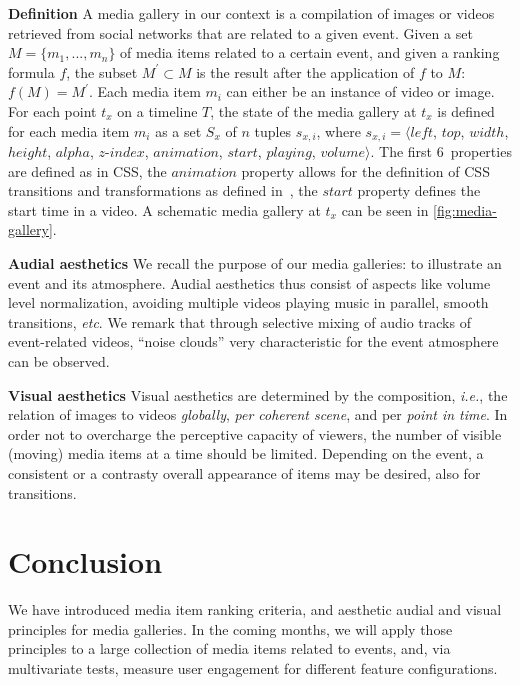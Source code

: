 \documentclass{article}
\let\oldsection\section
\renewcommand{\section}[1]{\oldsection{#1}\vspace{-1em}}
\begin{document}
\noindent \textbf{Definition}
A media gallery in our context is a compilation of images or videos
retrieved from social networks that are related to a given event.
Given a set $M = \{m_1,..., m_n\}$ of media items related to a certain event,
and given a ranking formula $f$,
the subset $M^\prime \subset M$
is the result after the application of $f$ to $M$: $f(M)=M^\prime$.
Each media item $m_i$ can either be an instance of video or image.
For each point $t_x$ on a timeline $T$, the state of the media gallery
at $t_x$ is defined for each media item $m_i$
as a set $S_x$ of $n$ tuples $s_{x,i}$, where
$s_{x,i}=\langle \mathit{left}$, $\mathit{top}$, $\mathit{width}$, $\mathit{height}$,
$\mathit{alpha}$, $\mathit{z\mbox{-}index}$, $\mathit{animation}$,
$\mathit{start}$, $\mathit{playing}$, $\mathit{volume} \rangle$.
The first 6~properties are defined as in CSS, the $\mathit{animation}$ property
allows for the definition of CSS transitions
and transformations as defined in~\cite{CSSTransitions2009,CSSTransforms2012},
the $\mathit{start}$ property defines the start time in a video.
A schematic media gallery at $t_x$ can be seen in \autoref{fig:media-gallery}.

\noindent \textbf{Audial aesthetics}
We recall the purpose of our media galleries:
to illustrate an event and its atmosphere.
Audial aesthetics thus consist of aspects like volume level normalization,
avoiding multiple videos playing music in parallel, smooth transitions, \emph{etc}.
We remark that through selective mixing of audio tracks
of event-related videos, ``noise clouds'' very characteristic
for the event atmosphere can be observed.

\noindent \textbf{Visual aesthetics}
Visual aesthetics are determined by the composition, \emph{i.e.},
the relation of images to videos \emph{globally}, \emph{per coherent scene},
and per \emph{point in time}.
In order not to overcharge the perceptive capacity
of viewers, the number of visible (moving) media items
at a time should be limited.
Depending on the event, a consistent or a contrasty overall
appearance of items may be desired, also for transitions.

\section{Conclusion}
We have introduced media item ranking criteria, and
aesthetic audial and visual principles for media galleries.
In the coming months, we will apply those principles
to a large collection of media items related to events,
and, via multivariate tests, measure user engagement
for different feature configurations.

\let\oldbibitem\bibitem
\renewcommand{\bibitem}[1]{%
	\ifx\bibstarted\undefined
		\def\bibstarted{1}
		\vspace{.1em}
	\else
		\vspace{-.2em plus .1em minus .1em}
	\fi
\oldbibitem{#1}}



\end{document}
